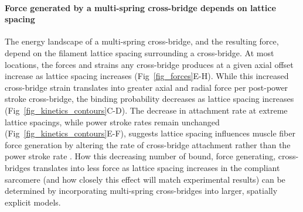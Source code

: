 \documentclass[10pt]{article}
\newcommand{\citep}[1]{\cite{#1}} %
\begin{document}
\paragraph{Force generated by a multi-spring cross-bridge depends on lattice spacing} %
The energy landscape of a multi-spring cross-bridge, and the resulting force, depend on the filament lattice spacing surrounding a cross-bridge. 
At most locations, the forces and strains any cross-bridge produces at a given axial offset increase as lattice spacing increases (Fig~\ref{fig_forces}E-H). 
While this increased cross-bridge strain translates into greater axial and radial force per post-power stroke cross-bridge, the binding probability decreases as lattice spacing increases (Fig~\ref{fig_kinetics_contours}C-D).
The decrease in attachment rate at extreme lattice spacings, while power stroke rates remain unchanged (Fig~\ref{fig_kinetics_contours}E-F), suggests lattice spacing influences muscle fiber force generation by altering the rate of cross-bridge attachment rather than the power stroke rate \citep{Martyn2004}. 
How this decreasing number of bound, force generating, cross-bridges translates into less force as lattice spacing increases in the compliant sarcomere (and how closely this effect will match experimental results) can be determined by incorporating multi-spring cross-bridges into larger, spatially explicit models. 
\end{document}
